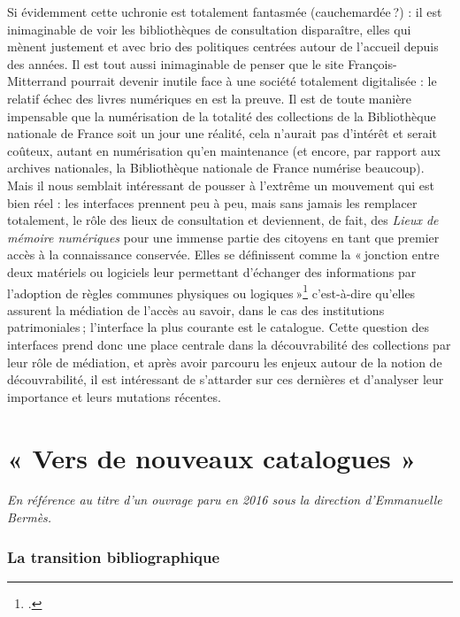 Si évidemment cette uchronie est totalement fantasmée (cauchemardée ?) : il est inimaginable de voir les bibliothèques de consultation disparaître, elles qui mènent justement et avec brio des politiques centrées autour de l’accueil depuis des années. Il est tout aussi inimaginable de penser que le site François-Mitterrand pourrait devenir inutile face à une société totalement digitalisée : le relatif échec des livres numériques en est la preuve. Il est de toute manière impensable que la numérisation de la totalité des collections de la Bibliothèque nationale de France soit un jour une réalité, cela n’aurait pas d’intérêt et serait coûteux, autant en numérisation qu'en maintenance (et encore, par rapport aux archives nationales, la Bibliothèque nationale de France numérise beaucoup). Mais il nous semblait intéressant de pousser à l’extrême un mouvement qui est bien réel : les interfaces prennent peu à peu, mais sans jamais les remplacer totalement, le rôle des lieux de consultation et deviennent, de fait, des \textit{Lieux de mémoire numériques }pour une immense partie des citoyens en tant que premier accès à la connaissance conservée. Elles se définissent comme la « jonction entre deux matériels ou logiciels leur permettant d’échanger des informations par l’adoption de règles communes physiques ou logiques »\footcite{zotero-205} c’est-à-dire qu’elles assurent la médiation de l’accès au savoir, dans le cas des institutions patrimoniales ; l’interface la plus courante est le catalogue. Cette question des interfaces prend donc une place centrale dans la découvrabilité des collections par leur rôle de médiation, et après avoir parcouru les enjeux autour de la notion de découvrabilité, il est intéressant de s’attarder sur ces dernières et d’analyser leur importance et leurs mutations récentes.

\chapter{« Vers de nouveaux catalogues »}

\vspace{-3em} %

\textit{En référence au titre d’un ouvrage paru en 2016 sous la direction d’Emmanuelle Bermès.}

\subsection{La transition bibliographique}

